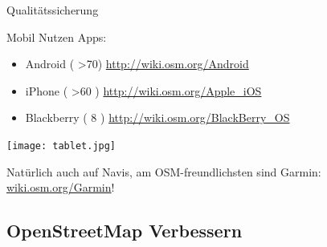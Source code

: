 \documentclass[handout]{beamer}
\begin{document}
\begin{frame}{Qualitätssicherung}

\end{frame}


\begin{frame}{Mobil Nutzen}
	Apps:
 
 \begin{itemize}
   \item  Android ( \textgreater 70) \url{http://wiki.osm.org/Android}
   \item  iPhone ( \textgreater 60 )  \url{http://wiki.osm.org/Apple\_iOS}
   \item  Blackberry ( 8 ) \url{http://wiki.osm.org/BlackBerry\_OS}
 \end{itemize}
 
 \begin{center}
 \texttt{[image: tablet.jpg]}
 \end{center}

 Natürlich auch auf Navis, am OSM-freundlichsten sind Garmin: \href{http://wiki.osm.org/Garmin}{wiki.osm.org/Garmin}!

\end{frame}

  \subsection{ OpenStreetMap Verbessern}
\end{document}
